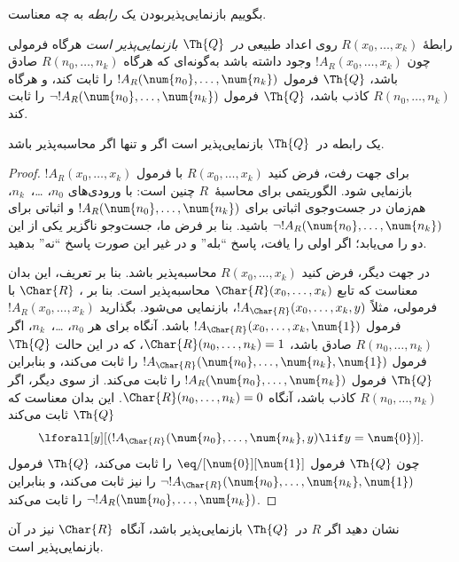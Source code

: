 \documentclass[../../../include/open-logic-section]{subfiles}
\begin{document}


بگوییم بازنمایی‌پذیربودن یک \emph{رابطه} به چه معناست.

\begin{defn}
 رابطهٔ $R(x_0,\dots,x_k)$ روی
اعداد طبیعی {\em در~$\Th{Q}$ بازنمایی‌پذیر است} هرگاه فرمولی چون
$!A_R(x_0,\dots,x_k)$ وجود داشته باشد به‌گونه‌ای که هرگاه
$R(n_0,\dots,n_k)$ صادق باشد، $\Th{Q}$ فرمول
$!A_R(\num{n_0},\dots,\num{n_k})$ را ثابت کند، و هرگاه
$R(n_0,\dots,n_k)$ کاذب باشد، $\Th{Q}$ فرمول
$\lnot !A_R(\num{n_0}, \dots, \num{n_k})$ را ثابت کند.
\end{defn}

\begin{thm}
 یک رابطه در~$\Th{Q}$ بازنمایی‌پذیر
است اگر و تنها اگر محاسبه‌پذیر باشد.
\end{thm}

\begin{proof}
برای جهت رفت، فرض کنید $R(x_0,\dots,x_k)$ با فرمول
$!A_R(x_0,\dots,x_k)$ بازنمایی شود. الگوریتمی برای محاسبهٔ~$R$ چنین
است: با ورودی‌های $n_0$، \dots،~$n_k$، هم‌زمان در جست‌وجوی اثباتی برای
$!A_R(\num{n_0}, \dots, \num{n_k})$ و اثباتی برای
$\lnot !A_R(\num{n_0}, \dots, \num{n_k})$ باشید. بنا بر فرض ما،
جست‌وجو ناگزیر یکی از این دو را می‌یابد؛ اگر اولی را یافت، پاسخ
``بله'' و در غیر این صورت پاسخ ``نه'' بدهید.

در جهت دیگر، فرض کنید $R(x_0, \dots, x_k)$ محاسبه‌پذیر باشد. بنا بر
تعریف، این بدان معناست که تابع $\Char{R}(x_0, \dots, x_k)$
محاسبه‌پذیر است. بنا بر ،
$\Char{R}$ با فرمولی، مثلاً $!A_{\Char{R}}(x_0, \dots, x_k,
y)$، بازنمایی می‌شود. بگذارید $!A_R(x_0, \dots, x_k)$ فرمول
$!A_{\Char{R}}(x_0, \dots, x_k, \num{1})$ باشد. آنگاه برای هر
$n_0$، \dots،~$n_k$، اگر $R(n_0, \dots, n_k)$ صادق باشد،
$\Char{R}(n_0, \dots, n_k) = 1$، که در این حالت $\Th{Q}$ فرمول
$!A_{\Char{R}}(\num{n_0}, \dots, \num{n_k}, \num{1})$ را ثابت
می‌کند، و بنابراین $\Th{Q}$ فرمول $!A_R(\num{n_0}, \dots,
\num{n_k})$ را ثابت می‌کند. از سوی دیگر، اگر
$R(n_0, \dots, n_k)$ کاذب باشد، آنگاه
$\Char{R}(n_0, \dots, n_k) = 0$. این بدان معناست که $\Th{Q}$ ثابت
می‌کند
\[
\lforall[y][(!A_{\Char{R}}(\num{n_0}, \dots, \num{n_k}, y) \lif y =
  \num{0})].
\]
چون $\Th{Q}$ فرمول $\eq/[\num{0}][\num{1}]$ را ثابت می‌کند، $\Th{Q}$ فرمول
$\lnot !A_{\Char{R}}(\num{n_0}, \dots, \num{n_k}, \num{1})$ را نیز
ثابت می‌کند، و بنابراین $\lnot !A_R(\num{n_0}, \dots,
\num{n_k})$ را ثابت می‌کند.
\end{proof}

\begin{prob}
نشان دهید اگر $R$ در~$\Th{Q}$ بازنمایی‌پذیر باشد، آنگاه~$\Char{R}$
نیز در آن بازنمایی‌پذیر است.
\end{prob}
\end{document}
